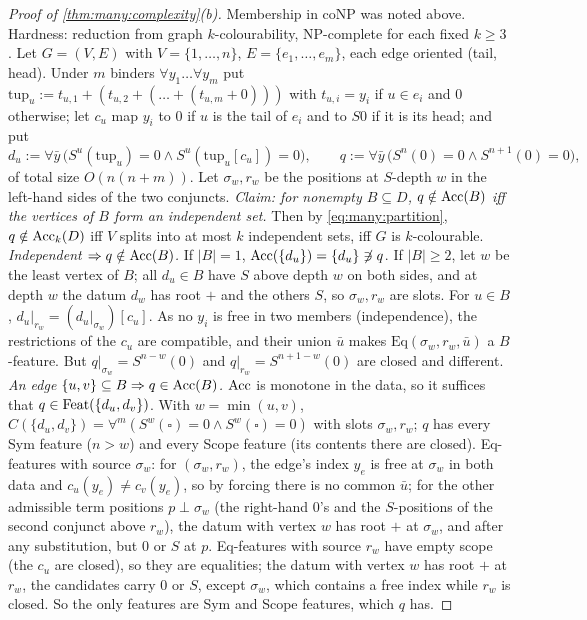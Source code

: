 \begin{proof}[Proof of \cref{thm:many:complexity}(b)]
Membership in coNP was noted above. Hardness: reduction from graph $k$-colourability, NP-complete for each fixed $k\ge3$
\citep{karp1972reducibility,garey1979computers}. Let $G=(V,E)$ with $V=\{1,\dots,n\}$, $E=\{e_1,\dots,e_m\}$, each edge
oriented (tail, head). Under $m$ binders $\forall y_1\dots\forall y_m$ put $\mathrm{tup}_u:=t_{u,1}+(t_{u,2}+(\dots+(t_{u,m}+0)))$
with $t_{u,i}=y_i$ if $u\in e_i$ and $0$ otherwise; let $c_u$ map $y_i$ to $0$ if $u$ is the tail of $e_i$ and to $S0$ if it is
its head; and put
\[
d_u:=\forall\bar y\,\bigl(S^u(\mathrm{tup}_u)=0\wedge S^u(\mathrm{tup}_u[c_u])=0\bigr),\qquad
q:=\forall\bar y\,\bigl(S^n(0)=0\wedge S^{n+1}(0)=0\bigr),
\]
of total size $O(n(n+m))$. Let $\sigma_w,r_w$ be the positions at $S$-depth $w$ in the left-hand sides of the two conjuncts.
\emph{Claim: for nonempty $B\subseteq D$, $q\notin\mathrm{Acc}(B)$ iff the vertices of $B$ form an independent set.} Then by
\eqref{eq:many:partition}, $q\notin\mathrm{Acc}_k(D)$ iff $V$ splits into at most $k$ independent sets, iff $G$ is $k$-colourable.
\emph{Independent $\Rightarrow q\notin\mathrm{Acc}(B)$.} If $|B|=1$, $\mathrm{Acc}(\{d_u\})=\{d_u\}\not\ni q$. If $|B|\ge2$, let $w$ be the least
vertex of $B$; all $d_u\in B$ have $S$ above depth $w$ on both sides, and at depth $w$ the datum $d_w$ has root $+$ and the
others $S$, so $\sigma_w,r_w$ are slots. For $u\in B$, $d_u|_{r_w}=(d_u|_{\sigma_w})[c_u]$. As no $y_i$ is free in two members
(independence), the restrictions of the $c_u$ are compatible, and their union $\bar u$ makes $\mathrm{Eq}(\sigma_w,r_w,\bar u)$
a $B$-feature. But $q|_{\sigma_w}=S^{n-w}(0)$ and $q|_{r_w}=S^{n+1-w}(0)$ are closed and different.
\emph{An edge $\{u,v\}\subseteq B\Rightarrow q\in\mathrm{Acc}(B)$.} $\mathrm{Acc}$ is monotone in the data, so it suffices that $q\in
\mathrm{Feat}(\{d_u,d_v\})$. With $w=\min(u,v)$, $C(\{d_u,d_v\})=\forall^m(S^w(\square)=0\wedge S^w(\square)=0)$ with slots
$\sigma_w,r_w$; $q$ has every Sym feature ($n>w$) and every Scope feature (its contents there are closed). Eq-features with
source $\sigma_w$: for $(\sigma_w,r_w)$, the edge's index $y_e$ is free at $\sigma_w$ in both data and $c_u(y_e)\neq c_v(y_e)$, so
by forcing there is no common $\bar u$; for the other admissible term positions $p\perp\sigma_w$ (the right-hand $0$'s and the
$S$-positions of the second conjunct above $r_w$), the datum with vertex $w$ has root $+$ at $\sigma_w$, and after any
substitution, but $0$ or $S$ at $p$. Eq-features with source $r_w$ have empty scope (the $c_u$ are closed), so they are
equalities; the datum with vertex $w$ has root $+$ at $r_w$, the candidates carry $0$ or $S$, except $\sigma_w$, which contains
a free index while $r_w$ is closed. So the only features are Sym and Scope features, which $q$ has.
\end{proof}

